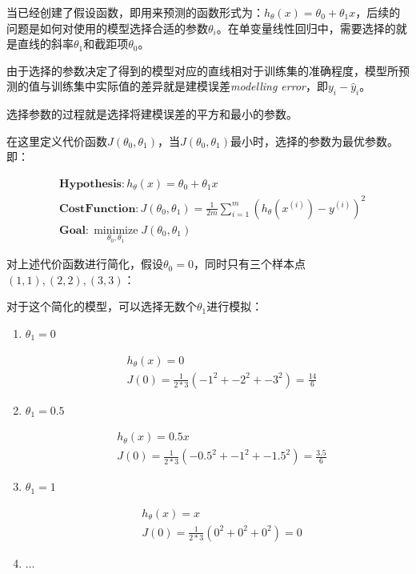 \documentclass[12pt, a4paper]{article}
\begin{document}
当已经创建了假设函数，即用来预测的函数形式为：$h_\theta(x)=\theta_0 + \theta_1x$，后续的问题是如何对使用的模型选择合适的参数$\theta_i$。在单变量线性回归中，需要选择的就是直线的斜率$\theta_1$和截距项$\theta_0$。

由于选择的参数决定了得到的模型对应的直线相对于训练集的准确程度，模型所预测的值与训练集中实际值的差异就是建模误差\textit{modelling error}，即$y_i - \hat{y}_i$。

选择参数的过程就是选择将建模误差的平方和最小的参数。

在这里定义代价函数$J(\theta_0, \theta_1)$，当$J(\theta_0, \theta_1)$最小时，选择的参数为最优参数。即：

\begin{align*}
     & \mathbf{Hypothesis}: h_\theta(x)=\theta_0 + \theta_1x                                                   \\
     & \mathbf{Cost Function}: J(\theta_0, \theta_1) = \frac{1}{2m}\sum_{i=1}^{m}(h_\theta(x^{(i)})-y^{(i)})^2 \\
     & \mathbf{Goal}: \mathop{minimize}\limits_{\theta_0, \theta_1}J(\theta_0, \theta_1)
\end{align*}

对上述代价函数进行简化，假设$\theta_0=0$，同时只有三个样本点$(1,1),(2,2),(3,3)$：

对于这个简化的模型，可以选择无数个$\theta_1$进行模拟：

\begin{enumerate}
    \item
          $\theta_1=0$

          \begin{align*}
               & h_\theta(x) = 0                                     \\
               & J(0) = \frac{1}{2*3}(-1^2+-2^2+-3^2) = \frac{14}{6}
          \end{align*}

    \item
          $\theta_1=0.5$

          \begin{align*}
               & h_\theta(x) = 0.5x                                       \\
               & J(0) = \frac{1}{2*3}(-0.5^2+-1^2+-1.5^2) = \frac{3.5}{6}
          \end{align*}

    \item
          $\theta_1=1$

          \begin{align*}
               & h_\theta(x) = x                       \\
               & J(0) = \frac{1}{2*3}(0^2+0^2+0^2) = 0
          \end{align*}

    \item
          $\dots$
\end{enumerate}
\end{document}
